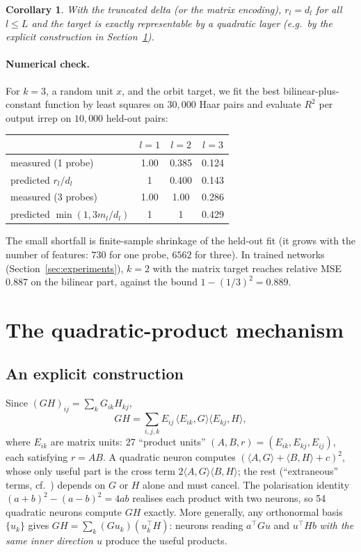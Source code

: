\documentclass[a4paper,11pt]{article}
\newtheorem{corollary}[proposition]{Corollary}
\theoremstyle{remark}
\theoremstyle{definition}
\newcommand{\ip}[2]{\langle #1, #2 \rangle}
\begin{document}
\begin{corollary}
With the truncated delta (or the matrix encoding), $r_l=d_l$ for all
$l\le L$ and the target is exactly representable by a quadratic layer
(e.g.\ by the explicit construction in Section~\ref{sec:mechanism}).
\end{corollary}

\paragraph{Numerical check.} For $k=3$, a random unit $x$, and the orbit target,
we fit the best bilinear-plus-constant function by least squares on $30{,}000$
Haar pairs and evaluate $R^2$ per output irrep on $10{,}000$ held-out pairs:

\begin{center}
\begin{tabular}{lccc}
\hline
& $l=1$ & $l=2$ & $l=3$\\
\hline
measured (1 probe) & 1.00 & 0.385 & 0.124\\
predicted $r_l/d_l$ & 1 & 0.400 & 0.143\\
measured (3 probes) & 1.00 & 1.00 & 0.286\\
predicted $\min(1,3m_l/d_l)$ & 1 & 1 & 0.429\\
\hline
\end{tabular}
\end{center}
The small shortfall is finite-sample shrinkage of the held-out fit (it grows
with the number of features: $730$ for one probe, $6562$ for three).
In trained networks (Section~\ref{sec:experiments}), $k=2$ with the matrix target
reaches relative MSE $0.887$ on the bilinear part, against the bound
$1-(1/3)^2=0.889$.

\section{The quadratic-product mechanism}
\label{sec:mechanism}

\subsection{An explicit construction}

Since $(GH)_{ij}=\sum_kG_{ik}H_{kj}$,
\begin{equation}\label{eq:matmul}
GH=\sum_{i,j,k}E_{ij}\,\ip{E_{ik}}{G}\ip{E_{kj}}{H},
\end{equation}
where $E_{ik}$ are matrix units: 27 ``product units'' $(A,B,r)=(E_{ik},E_{kj},E_{ij})$,
each satisfying $r=AB$. A quadratic neuron computes
$(\ip{A}{G}+\ip{B}{H}+c)^2$, whose only useful part is the cross term
$2\ip{A}{G}\ip{B}{H}$; the rest (``extraneous'' terms, cf.\
\cite{marchetti2026sequential}) depends on $G$ or $H$ alone and must cancel.
The polarisation identity $(a+b)^2-(a-b)^2=4ab$ realises each product with two
neurons, so 54 quadratic neurons compute $GH$ exactly. More generally, any
orthonormal basis $\{u_k\}$ gives $GH=\sum_k(Gu_k)(u_k^\top H)$: neurons reading
$a^\top Gu$ and $u^\top Hb$ \emph{with the same inner direction $u$} produce
the useful products.
\end{document}
